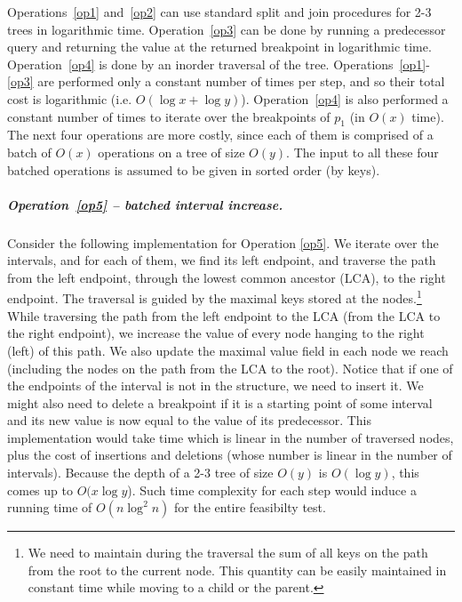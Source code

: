 \documentclass[a4paper,UKenglish]{lipics-v2016}
\theoremstyle{plain}
\renewcommand{\paragraph}{\subparagraph}
\begin{document}
 Operations~\ref{op1} and~\ref{op2} can use standard split and join procedures for 2-3 trees in logarithmic time. 
 Operation~\ref{op3} can be done by running a predecessor query and returning the value at the returned breakpoint in logarithmic time.
 Operation~\ref{op4} is done by an inorder traversal of the tree. 
Operations~\ref{op1}-\ref{op3} are performed only a constant number of times per step, and so their total cost is logarithmic (i.e. $O(\log x + \log y)$). Operation~\ref{op4} is also performed a constant number of times to iterate over the breakpoints of $p_{1}$ (in $O(x)$ time). The next four operations are more costly, since each of them is comprised of a batch of $O(x)$ operations on a tree of size $O(y)$. The input to all these four batched operations is assumed to be given in sorted order (by keys).


\paragraph{Operation~\ref{op5} -- batched interval increase.}
Consider the following implementation for Operation \ref{op5}. We iterate over the intervals, and for each of them, we find its left endpoint, and traverse the path from the left endpoint, through the lowest common ancestor (LCA), to the right endpoint.
The traversal is guided by the maximal keys stored at the nodes.\footnote{We need to maintain during the traversal the sum of all keys on the path from the root to the current node. This quantity can be easily maintained in constant time while moving to a child or the parent.}
While traversing the path from the left endpoint to the LCA (from the LCA to the right endpoint), we increase the value of every node hanging to the right (left) of this path. We also update the maximal value field in each node we reach (including the nodes on the path from the LCA to the root). Notice that if one of the endpoints of the interval is not in the structure, we need to insert it. We might also need to delete a breakpoint if it is a starting point of some interval and its new value is now equal to the value of its predecessor. This implementation would take time which is linear in the number of traversed nodes, plus the cost of insertions and deletions (whose number is linear in the number of intervals). Because the depth of a 2-3 tree of size $O(y)$ is $O(\log y)$, this comes up to $O(x \log y$). Such time complexity for each step would induce a running time of $O(n \log ^2 n)$ for the entire feasibilty test. 
\end{document}
